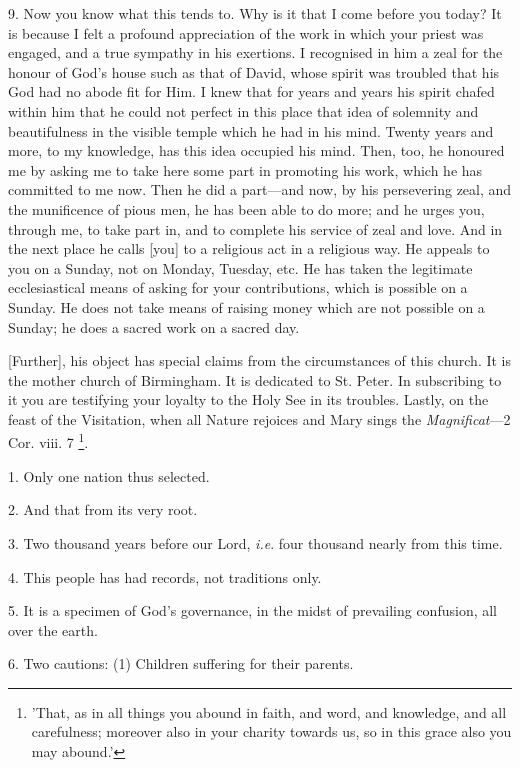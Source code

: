 9. Now you know what this tends to. Why is it
that I come before you today? It is because I felt a profound
appreciation of the work in which your priest was engaged, and a
true sympathy in his exertions. I recognised in him a zeal for the
honour of God's house such as that of David, whose spirit was troubled
that his God had no abode fit for Him. I knew that for years and years
his spirit chafed within him that he could not perfect in this place
that idea of solemnity and beautifulness in the visible temple which
he had in his mind. Twenty years and more, to my knowledge, has this
idea occupied his mind. Then, too, he honoured me by asking me to take
here some part in promoting his work, which he has committed to me
now. Then he did a part—and now, by his persevering zeal, and the
munificence of pious men, he has been able to do more; and he urges
you, through me, to take part in, and to complete his service of zeal
and love. And in the next place he calls [you] to a religious act in a
religious way. He appeals to you on a Sunday, not on Monday, Tuesday,
etc. He has taken the legitimate ecclesiastical means of asking for
your contributions, which is possible on a Sunday. He does not take
means of raising money which are not possible on a Sunday; he does a
sacred work on a sacred day.

[Further], his object has special claims from the
circumstances of this church. It is the mother church of Birmingham.
It is dedicated to St. Peter. In subscribing to it you are testifying
your loyalty to the Holy See in its troubles. Lastly, on the feast of
the Visitation, when all Nature rejoices and Mary sings the \emph{Magnificat}—2
Cor. viii. 7 \footnote{'That, as in all things
you abound in faith, and word, and knowledge, and all carefulness;
moreover also in your charity towards us, so in this grace also you
may abound.'}.


1. Only one nation thus selected.

2. And that from its very root.

3. Two thousand years before our Lord, \emph{i.e}.
four thousand nearly from this time.

4. This people has had records, not traditions
only.

5. It is a specimen of God's governance, in the
midst of prevailing confusion, all over the earth.

6. Two cautions: (1) Children suffering for their
parents.


